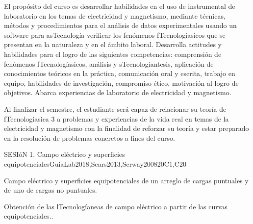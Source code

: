 \begin{syllabus}


\begin{justification}
El propósito del curso es desarrollar habilidades en el uso de instrumental de laboratorio en los temas de electricidad y magnetismo, mediante técnicas, métodos y procedimientos para el análisis de datos experimentales usando un software para asTecnología verificar los fenómenos fTecnologíasicos que se presentan en la naturaleza y en el ámbito laboral. Desarrolla actitudes y habilidades para el logro de las siguientes competencias: comprensión de fenómenos fTecnologíasicos, análisis y sTecnologíantesis, aplicación de conocimientos teóricos en la práctica, comunicación oral y escrita, trabajo en equipo, habilidades de investigación, compromiso ético, motivación al logro de objetivos. Abarca experiencias de laboratorio de electricidad y magnetismo. 
\end{justification}

\begin{goals}
\item Al finalizar el semestre, el estudiante será capaz de relacionar su teoría de fTecnologíasica 3 a problemas y experiencias de la vida real en temas de la electricidad y magnetismo con la finalidad de reforzar su teoría y estar preparado en la resolución de problemas concretos a fines del curso.
\end{goals}

\begin{outcomes}
\item {}
\item {}
\end{outcomes}

\begin{competences}
    \item {}
\end{competences}

\begin{unit}{SESIóN 1. Campo eléctrico y superficies equipotenciales}{}{GuiaLab2018,Sears2013,Serway2008}{20}{C1,C20}
\begin{topics}
      \item Campo eléctrico y superficies equipotenciales de un arreglo de cargas puntuales y de uno de cargas no puntuales.
      \item Obtención de las lTecnologíaneas de campo eléctrico a partir de las curvas equipotenciales..
\end{topics}
\end{unit}


\end{syllabus}
